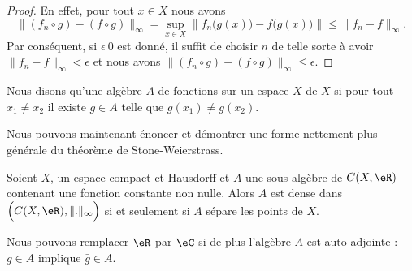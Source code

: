 \begin{proof}
    En effet, pour tout \( x\in X\) nous avons
    \begin{equation}
        \| (f_n\circ g)-(f\circ g) \|_{\infty}=\sup_{x\in X} \| f_n\big( g(x) \big)-f\big( g(x) \big) \|\leq \| f_n-f \|_{\infty}.
    \end{equation}
    Par conséquent, si \( \epsilon\>0\) est donné, il suffit de choisir \( n\) de telle sorte à avoir \( \| f_n-f \|_{\infty}<\epsilon\) et nous avons \( \| (f_n\circ g)-(f\circ g) \|_{\infty}\leq \epsilon\).
\end{proof}

\begin{definition}
    Nous disons qu'une algèbre \( A\) de fonctions sur un espace \( X\)  de \( X\) si pour tout \( x_1\neq x_2\) il existe \( g\in A\) telle que \( g(x_1)\neq g(x_2)\).
\end{definition}

Nous pouvons maintenant énoncer et démontrer une forme nettement plus générale du théorème de Stone-Weierstrass.
\begin{theorem} \label{ThoWmAzSMF}
    Soient \( X\), un espace compact et Hausdorff et \( A\) une sous algèbre de \( C(X,\eR)\) contenant une fonction constante non nulle. Alors \( A\) est dense dans \( \Big( C(X,\eR),\| . \|_{\infty}\Big)\) si et seulement si \( A\) sépare les points de \(X\).

    Nous pouvons remplacer \( \eR\) par \( \eC\) si de plus l'algèbre \( A\) est auto-adjointe : \( g\in A\) implique \( \bar g\in A\).
\end{theorem}

